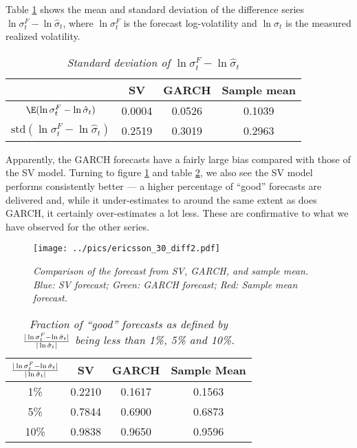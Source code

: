 Table \ref{tab:ericsson_30_diff1} shows the mean and standard
deviation of the difference series $\ln\sigma^F_t -
\ln\hat{\sigma}_t$, where $\ln\sigma^F_t$ is the forecast
log-volatility and $\ln\hat{\sigma}_t$ is the measured realized
volatility.
\begin{table}[htb!]
  \centering
  \begin{tabular}{|c|c|c|c|}
    \hline
    & SV & GARCH & Sample mean \\
    \hline
    $\E(\ln \sigma^F_t - \ln \hat{\sigma}_t)$ & 0.0004 &
    0.0526 & 0.1039 \\
    \hline
    $\text{std}(\ln \sigma^F_t - \ln \hat{\sigma}_t)$ & 0.2519 &
    0.3019 & 0.2963 \\
    \hline
  \end{tabular}
  \caption{\small \it Standard deviation of $\ln\sigma^F_t -
    \ln\hat{\sigma}_t$}
  \label{tab:ericsson_30_diff1}
\end{table}
Apparently, the GARCH forecasts have a fairly large bias compared with
those of the SV model. Turning to figure \ref{fig:ericsson_30_diff2}
and table \ref{tab:ericsson_30_diff3}, we also see the SV model
performs consistently better --- a higher percentage of ``good''
forecasts are delivered and, while it under-estimates to around the
same extent as does GARCH, it certainly over-estimates a lot
less. These are confirmative to what we have observed for the other
series.
\begin{figure}[htb!]
  \centering
    \texttt{[image: ../pics/ericsson\_30\_diff2.pdf]}
  \caption{\small \it Comparison of the forecast from SV, GARCH,
    and sample mean. Blue: SV forecast; Green: GARCH forecast; Red:
    Sample mean forecast.}
  \label{fig:ericsson_30_diff2}
\end{figure}

\begin{table}[htb!]
  \centering
  \begin{tabular}{|c|c|c|c|}
    \hline
    ${|\ln \sigma^F_t - \ln \hat{\sigma}_t| \over |\ln
      \hat{\sigma}_t|}$ &
    SV & GARCH & Sample Mean \\
    \hline
    1\% & 0.2210 & 0.1617 & 0.1563 \\
    \hline
    5\% & 0.7844 & 0.6900 & 0.6873 \\
    \hline
    10\% & 0.9838 & 0.9650 & 0.9596 \\
    \hline
  \end{tabular}
  \caption{\small \it Fraction of ``good'' forecasts as defined by
    ${|\ln \sigma^F_t - \ln \hat{\sigma}_t| \over |\ln
      \hat{\sigma}_t|}$ being less than 1\%, 5\% and 10\%.}
  \label{tab:ericsson_30_diff3}
\end{table}
